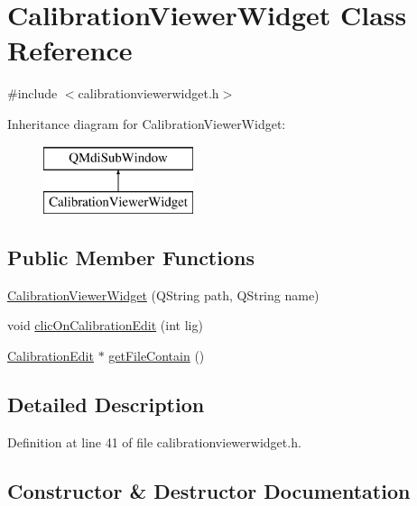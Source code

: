 \hypertarget{class_calibration_viewer_widget}{}\section{Calibration\+Viewer\+Widget Class Reference}
\label{class_calibration_viewer_widget}


{\ttfamily \#include $<$calibrationviewerwidget.\+h$>$}

Inheritance diagram for Calibration\+Viewer\+Widget\+:\begin{figure}[H]
\begin{center}
\leavevmode
\includegraphics[height=2.000000cm]{class_calibration_viewer_widget}
\end{center}
\end{figure}
\subsection*{Public Member Functions}
\begin{DoxyCompactItemize}
\item 
\mbox{\hyperlink{class_calibration_viewer_widget_a6a72896e900540fe6d73c077ab1f1447}{Calibration\+Viewer\+Widget}} (Q\+String path, Q\+String name)
\item 
void \mbox{\hyperlink{class_calibration_viewer_widget_a6df9ecb8964b01d71f7e9be5e17c0d36}{clic\+On\+Calibration\+Edit}} (int lig)
\item 
\mbox{\hyperlink{class_calibration_edit}{Calibration\+Edit}} $\ast$ \mbox{\hyperlink{class_calibration_viewer_widget_a48436eda300147eddd0e25f574dbca62}{get\+File\+Contain}} ()
\end{DoxyCompactItemize}


\subsection{Detailed Description}


Definition at line 41 of file calibrationviewerwidget.\+h.



\subsection{Constructor \& Destructor Documentation}
\mbox{\label{class_calibration_viewer_widget_a6a72896e900540fe6d73c077ab1f1447}} 
